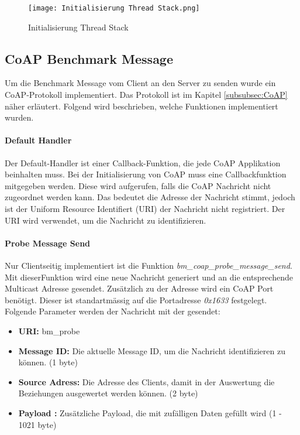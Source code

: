 \begin{figure}[H]
	\centering
	\texttt{[image: Initialisierung Thread Stack.png]}
	\caption{Initialisierung Thread Stack}\label{fig:InitialisierungThreadStack}
\end{figure}

\newpage
\subsection{CoAP Benchmark Message}\label{subsec:ThreadBenchmarkMessage}
Um die Benchmark Message vom Client an den Server zu senden wurde ein CoAP-Protokoll implementiert. Das Protokoll ist im Kapitel \ref{subsubsec:CoAP} näher erläutert. Folgend wird beschrieben, welche Funktionen implementiert wurden.

\paragraph{Default Handler} 
Der Default-Handler ist einer Callback-Funktion, die jede CoAP Applikation beinhalten muss. Bei der Initialisierung von CoAP muss eine Callbackfunktion mitgegeben werden. Diese wird aufgerufen, falls die CoAP Nachricht nicht zugeordnet werden kann. Das bedeutet die Adresse der Nachricht stimmt, jedoch ist der Uniform Resource Identifiert (URI) der Nachricht nicht registriert. Der URI wird verwendet, um die Nachricht zu identifizieren. 

\paragraph{Probe Message Send}
Nur Clientseitig implementiert ist die Funktion \textit{bm\_coap\_probe\_message\_send}. Mit dieser\linebreak Funktion wird eine neue Nachricht generiert und an die entsprechende Multicast Adresse gesendet. Zusätzlich zu der Adresse wird ein CoAP Port benötigt. Dieser ist standartmässig auf die Portadresse \textit{0x1633} festgelegt. Folgende Parameter werden der Nachricht mit der gesendet:

\begin{itemize}
	\item \textbf{URI:} bm\_probe
	\item \textbf{Message ID:} Die aktuelle Message ID, um die Nachricht identifizieren zu können. (1 byte)
	\item \textbf{Source Adress:} Die Adresse des Clients, damit in der Auswertung die Beziehungen ausgewertet werden können. (2 byte)
	\item \textbf{Payload :} Zusätzliche Payload, die mit zufälligen Daten gefüllt wird (1 - 1021 byte)
\end{itemize}

